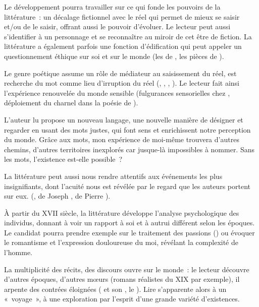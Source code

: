 {Le développement pourra travailler sur ce qui fonde les pouvoirs de la littérature~: un
décalage fictionnel avec le réel qui permet de mieux se saisir et/ou de le saisir, offrant
aussi le pouvoir d'évoluer. Le lecteur peut aussi s'identifier à un personnage et se
reconnaître au miroir de cet être de fiction. La littérature a également parfois une
fonction d'édification qui peut appeler un questionnement éthique sur soi et sur le
monde (les  de , les pièces de ).

Le genre poétique assume un rôle de médiateur au saisissement du réel, est recherche
du mot comme lieu d'irruption du réel (, , , ). Le
lecteur fait ainsi l'expérience renouvelée du monde sensible (fulgurances sensorielles
chez , déploiement du charnel dans la poésie de ).

L'auteur lu propose un nouveau langage, une nouvelle manière de désigner et
regarder en usant des mots justes, qui font sens et enrichissent notre perception du
monde. Grâce aux mots, mon expérience de moi-même trouvera d'autres chemins,
d'autres territoires inexplorés car jusque-là impossibles à nommer. Sans les mots,
l'existence est-elle possible~?

La littérature peut aussi nous rendre attentifs aux événements les plus insignifiants,
dont l'acuité nous est révélée par le regard que les auteurs portent sur eux. (,  de Joseph ,  de Pierre ).

À partir du XVII\ieme{} siècle, la littérature développe l'analyse psychologique des individus,
donnant à voir un rapport à soi et à autrui différent selon les époques. Le candidat
pourra prendre exemple sur le traitement des passions () ou
évoquer le romantisme et l'expression douloureuse du moi, révélant la complexité de
l'homme.

La multiplicité des récits, des discours ouvre sur le monde~: le lecteur découvre
d'autres époques, d'autres mœurs (romans réalistes du XIX\ieme{} par exemple), il arpente
des contrées éloignées ( et son , le ). Lire
s'apparente alors à un «~voyage~», à une exploration par l'esprit d'une grande variété
d'existences.

}
